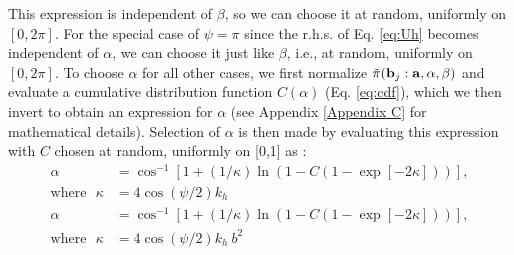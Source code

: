         This expression is independent of $\beta$, so we can choose it at random, uniformly on $[0, 2\pi]$. For the special case of $\psi = \pi$ since the r.h.s. of Eq. \eqref{eq:Uh} becomes independent of $\alpha$, we can choose it just like $\beta$, i.e., at random, uniformly on $[0, 2\pi]$. To choose $\alpha$ for all other cases, we first normalize $\tilde \pi({\mathbf {b}}_j: \mathbf{a}, \alpha, \beta) $ and evaluate a cumulative distribution function $C(\alpha)$ (Eq. \eqref{eq:cdf}), which we then invert to obtain an expression for $\alpha$ (see Appendix \ref{Appendix C} for mathematical details). Selection of $\alpha$ is then made by evaluating this expression with $C$ chosen at random, uniformly on [0,1] as :
        \ifkhExplicitP
            \begin{equation}
            \label{eq:alpha}
                \begin{aligned}
                    \alpha &= \cos^{-1} \left[1 +  (1/\kappa)\ln\left(1 - C (1-\exp[-2\kappa]) \right) \right],\\
                    \text{where}\:\:\: \kappa &= 4 \cos(\psi/2) k_h
                \end{aligned}
            \end{equation}
        \else
            \begin{equation}
            \label{eq:alpha}
                \begin{aligned}
                    \alpha &= \cos^{-1} \left[1 +  (1/\kappa)\ln\left(1 - C (1-\exp[-2\kappa]) \right) \right],\\
                    \text{where}\:\:\: \kappa &= 4 \cos(\psi/2) k_h~b^2
                \end{aligned}
            \end{equation}
        \fi

